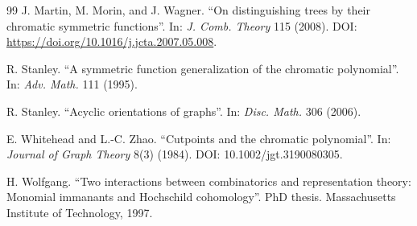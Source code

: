 \documentclass[12pt]{amsart}  %
\theoremstyle{definition}
\theoremstyle{remark}
\numberwithin{equation}{section}
\begin{document}
\begin{thebibliography}{99}
 J. Martin, M. Morin, and J. Wagner. ``On distinguishing trees by their chromatic symmetric functions''. In: \textit{J. Comb. Theory} 115 (2008). DOI: \href{https://doi.org}{https://doi.org/10.1016/j.jcta.2007.05.008}.

 R. Stanley. ``A symmetric function generalization of the chromatic polynomial''. In: \textit{Adv. Math.} 111 (1995).

 R. Stanley. ``Acyclic orientations of graphs''. In: \textit{Disc. Math.} 306 (2006).

 E. Whitehead and L.-C. Zhao. ``Cutpoints and the chromatic polynomial''. In: \textit{Journal of Graph Theory} 8(3) (1984). DOI: 10.1002/jgt.3190080305.

 H. Wolfgang. ``Two interactions between combinatorics and representation theory: Monomial immanants and Hochschild cohomology''. PhD thesis. Massachusetts Institute of Technology, 1997.

\end{thebibliography}


\end{document}
